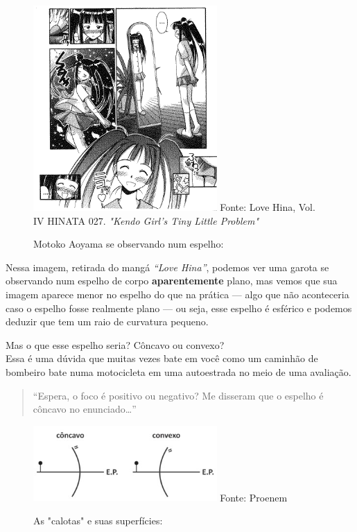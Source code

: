 \documentclass[
  a4paper]{article}
\begin{document}
\begin{figure}[!h]
\centering
    \caption{Motoko Aoyama se observando num espelho:} 
    \includegraphics[width=70mm]{../_img/motoko_aoyama_convex_mirror.png}
    \linebreak
    Fonte: Love Hina, Vol. IV HINATA 027. \textit{"Kendo Girl's Tiny Little Problem"}  
\end{figure}

Nessa imagem, retirada do mangá \emph{``Love Hina''}, podemos ver uma
garota se observando num espelho de corpo \textbf{aparentemente} plano,
mas vemos que sua imagem aparece menor no espelho do que na prática ---
algo que não aconteceria caso o espelho fosse realmente plano --- ou
seja, esse espelho é esférico e podemos deduzir que tem um raio de
curvatura pequeno.

Mas o que esse espelho seria? Côncavo ou convexo?\\
Essa é uma dúvida que muitas vezes bate em você como um caminhão de
bombeiro bate numa motocicleta em uma autoestrada no meio de uma
avaliação.

\begin{quote}
``Espera, o foco é positivo ou negativo? Me disseram que o espelho é
côncavo no enunciado\ldots{}''
\end{quote}

\begin{figure}[!h]
\centering
    \caption{As "calotas" e suas superfícies:} 
    \includegraphics[width=70mm]{../_img/Screenshot_2921.jpg}
    \linebreak
    Fonte: Proenem 
\end{figure}
\end{document}

